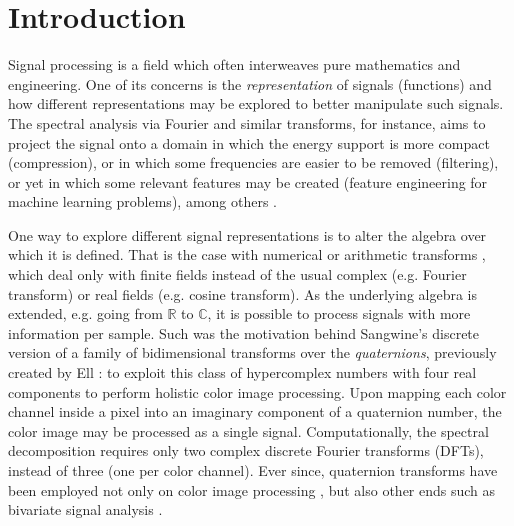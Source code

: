 \chapter{Introduction}

Signal processing is a field which often interweaves pure mathematics and engineering. One of its concerns is the \textit{representation} of signals (functions) and how different representations may be explored to better manipulate such signals. The spectral analysis via Fourier and similar transforms, for instance, aims to project the signal onto a domain in which the energy support is more compact (compression), or in which some frequencies are easier to be removed (filtering), or yet in which some relevant features may be created (feature engineering for machine learning problems), among others \cite{oppenheim1999discrete, rabiner2010theory, graf2015features, vergin1999generalized}.

One way to explore different signal representations is to alter the algebra over which it is defined. That is the case with numerical or arithmetic transforms \cite{blahut2010fast,pedrouzo2017number,chandra2014exact}, which deal only with finite fields instead of the usual complex (e.g. Fourier transform) or real fields (e.g. cosine transform). As the underlying algebra is extended, e.g. going from $ \mathbb{R} $ to $ \mathbb{C} $, it is possible to process signals with more information per sample. Such was the motivation behind Sangwine's \cite{sangwine1996fourier} discrete version of a family of bidimensional transforms over the \textit{quaternions}, previously created by Ell \cite{ell1993quaternion}: to exploit this class of hypercomplex numbers with four real components to perform holistic color image processing. Upon mapping each color channel inside a pixel into an imaginary component of a quaternion number, the color image may be processed as a single signal. Computationally, the spectral decomposition requires only two complex discrete Fourier transforms (DFTs), instead of three (one per color channel). Ever since, quaternion transforms have been employed not only on color image processing \cite{ell2007hypercomplex,chen2018quaternion,li2013quaternion,evans2000hypercomplex}, but also other ends such as bivariate signal analysis \cite{flamant2017spectral,flamant2017time,flamant2018complete}.

